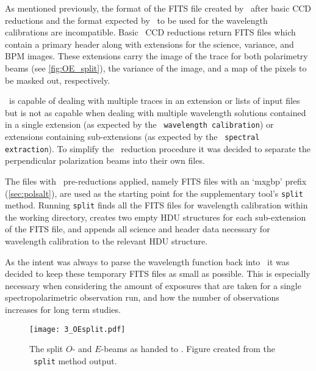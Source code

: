 

As mentioned previously, the format of the \gls{FITS} file created by \polsalt\ after basic \gls{CCD} reductions and the format expected by \iraf\ to be used for the wavelength calibrations are incompatible. Basic \polsalt\ \gls{CCD} reductions return \gls{FITS} files which contain a primary header along with extensions for the science, variance, and \gls{BPM} images. These extensions carry the image of the trace for both polarimetry beams (see \autoref{fig:OE_split}), the variance of the image, and a map of the pixels to be masked out, respectively.

\iraf\ is capable of dealing with multiple traces in an extension or lists of input files but is not as capable when dealing with multiple wavelength solutions contained in a single extension (as expected by the \polsalt\ \texttt{wavelength calibration}) or extensions containing sub-extensions (as expected by the \polsalt\ \texttt{spectral extraction}). To simplify the \iraf\ reduction procedure it was decided to separate the perpendicular polarization beams into their own files.

The files with \polsalt\ pre-reductions applied, namely \gls{FITS} files with an `mxgbp' prefix (\autoref{sec:polsalt}), are used as the starting point for the supplementary tool's \texttt{split} method. Running \texttt{split} finds all the \gls{FITS} files for wavelength calibration within the working directory, creates two empty \gls{HDU} structures for each sub-extension of the \gls{FITS} file, and appends all science and header data necessary for wavelength calibration to the relevant \gls{HDU} structure.

As the intent was always to parse the wavelength function back into \polsalt\ it was decided to keep these temporary \gls{FITS} files as small as possible. This is especially necessary when considering the amount of exposures that are taken for a single spectropolarimetric observation run, and how the number of observations increases for long term studies.

\begin{figure}[t]
    \centering
    \texttt{[image: 3\_OEsplit.pdf]}
    \caption{The split $O$- and $E$-beams as handed to \iraf. Figure created from the \stops\ \texttt{split} method output.}
    \label{fig:OE_split}
\end{figure}

